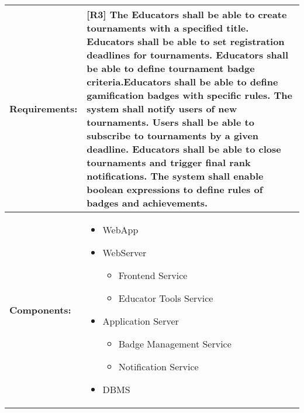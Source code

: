 \begin{table}[!ht]
    \centering
    {\renewcommand{\arraystretch}{2} %
    \setlength{\tabcolsep}{0.5em} %
    \begin{tabularx}{\textwidth}{|l|X|}
    \hline
       \textbf{Requirements:} & [R3] The Educators shall be able to create tournaments with a specified title. \newline
       [R4] Educators shall be able to set registration deadlines for tournaments. \newline 
       [R5] Educators shall be able to define tournament badge criteria.\newline
       [R24] Educators shall be able to define gamification badges with specific rules. \newline
       [R6] The system shall notify users of new tournaments. \newline
       [R7] Users shall be able to subscribe to tournaments by a given deadline. \newline
       [R26] Educators shall be able to close tournaments and trigger final rank notifications. \newline
       [R27] The system shall enable boolean expressions to define rules of badges and achievements.
       \\ \hline
        \textbf{Components:} & 
        \begin{minipage} [t] {0.4\textwidth} 
      \begin{itemize}
      \item WebApp
      \item WebServer
        \begin{itemize}
            \item Frontend Service
            \item Educator Tools Service
        \end{itemize}
      \item Application Server
        \begin{itemize}
            \item Badge Management Service 
            \item Notification Service
        \end{itemize}
      \item DBMS
     \end{itemize} 
    \end{minipage} \\ [2pt]  \hline
    \end{tabularx}} \quad
\end{table}

